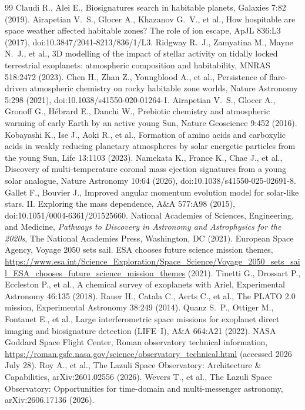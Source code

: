 \begin{thebibliography}{99}
 Claudi R., Alei E., Biosignatures search in habitable planets, Galaxies 7:82 (2019).
 Airapetian V.~S., Glocer A., Khazanov G.~V., et al., How hospitable are space weather affected habitable zones? The role of ion escape, ApJL 836:L3 (2017), doi:10.3847/2041-8213/836/1/L3.
 Ridgway R.~J., Zamyatina M., Mayne N.~J., et al., 3D modelling of the impact of stellar activity on tidally locked terrestrial exoplanets: atmospheric composition and habitability, MNRAS 518:2472 (2023).
 Chen H., Zhan Z., Youngblood A., et al., Persistence of flare-driven atmospheric chemistry on rocky habitable zone worlds, Nature Astronomy 5:298 (2021), doi:10.1038/s41550-020-01264-1.
 Airapetian V.~S., Glocer A., Gronoff G., H\'{e}brard E., Danchi W., Prebiotic chemistry and atmospheric warming of early Earth by an active young Sun, Nature Geoscience 9:452 (2016).
 Kobayashi K., Ise J., Aoki R., et al., Formation of amino acids and carboxylic acids in weakly reducing planetary atmospheres by solar energetic particles from the young Sun, Life 13:1103 (2023).
 Namekata K., France K., Chae J., et al., Discovery of multi-temperature coronal mass ejection signatures from a young solar analogue, Nature Astronomy 10:64 (2026), doi:10.1038/s41550-025-02691-8.
 Gallet F., Bouvier J., Improved angular momentum evolution model for solar-like stars. II. Exploring the mass dependence, A\&A 577:A98 (2015), doi:10.1051/0004-6361/201525660.
 National Academies of Sciences, Engineering, and Medicine, \emph{Pathways to Discovery in Astronomy and Astrophysics for the 2020s}, The National Academies Press, Washington, DC (2021).
 European Space Agency, Voyage 2050 sets sail. ESA chooses future science mission themes, \url{https://www.esa.int/Science_Exploration/Space_Science/Voyage_2050_sets_sail_ESA_chooses_future_science_mission_themes} (2021).
 Tinetti G., Drossart P., Eccleston P., et al., A chemical survey of exoplanets with Ariel, Experimental Astronomy 46:135 (2018).
 Rauer H., Catala C., Aerts C., et al., The PLATO 2.0 mission, Experimental Astronomy 38:249 (2014).
 Quanz S.~P., Ottiger M., Fontanet E., et al., Large interferometric space missions for exoplanet direct imaging and biosignature detection (LIFE~I), A\&A 664:A21 (2022).
 NASA Goddard Space Flight Center, Roman observatory technical information, \url{https://roman.gsfc.nasa.gov/science/observatory_technical.html} (accessed 2026 July 28).
 Roy A., et al., The Lazuli Space Observatory: Architecture \& Capabilities, arXiv:2601.02556 (2026).
 Wevers T., et al., The Lazuli Space Observatory: Opportunities for time-domain and multi-messenger astronomy, arXiv:2606.17136 (2026).
\end{thebibliography}

